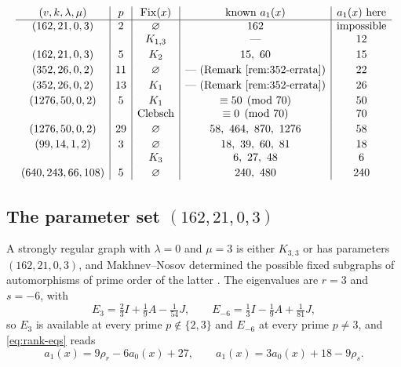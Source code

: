 \documentclass[11pt]{article}
\theoremstyle{plain}
\theoremstyle{remark}
\newcommand{\Fix}{\operatorname{Fix}}
\begin{document}
\begin{table}[t]
\caption{Sharpenings obtained in this section.
Each line gives one branch:
the fixed subgraph, the constraint on $a_1(x)$ that the cited analysis leaves
(``known''; a dash if no valid constraint is available),
and the exact value produced by the rank equations \eqref{eq:rank-eqs} --- or the impossibility of the branch.
``Clebsch'' denotes the unique $\mathrm{srg}(16,5,0,2)$; for the name see Section \ref{subsec:mu2}.
Sources: $(162,21,0,3)$ \cite{MakhnevNosov}; $(352,26,0,2)$ \cite{MakhnevNosov2004};
$(1276,50,0,2)$ \cite{Nosov2016}; $(99,14,1,2)$ \cite{MakhnevMinakova}; $(640,243,66,108)$ \cite{MakhnevNirova}.}\label{tab:sharpening}
\begingroup
\footnotesize
\setlength{\arraycolsep}{2pt}
\[
\begin{array}{c|c|c|c|c}
 (v,k,\lambda,\mu) & p & \Fix(x) & \text{known }a_1(x) & a_1(x)\text{ here}\\
\hline
 (162,21,0,3) & 2 & \varnothing & 162 & \text{impossible}\\
 & & K_{1,3} & \text{---} & 12\\[2pt]
 (162,21,0,3) & 5 & K_2 & 15,\ 60 & 15\\[2pt]
 (352,26,0,2) & 11 & \varnothing & \text{--- (Remark \ref{rem:352-errata})} & 22\\[2pt]
 (352,26,0,2) & 13 & K_1 & \text{--- (Remark \ref{rem:352-errata})} & 26\\[2pt]
 (1276,50,0,2) & 5 & K_1 & \equiv 50 \pmod{70} & 50\\
 & & \text{Clebsch} & \equiv 0 \pmod{70} & 70\\[2pt]
 (1276,50,0,2) & 29 & \varnothing & 58,\ 464,\ 870,\ 1276 & 58\\[2pt]
 (99,14,1,2) & 3 & \varnothing & 18,\ 39,\ 60,\ 81 & 18\\
 & & K_3 & 6,\ 27,\ 48 & 6\\[2pt]
 (640,243,66,108) & 5 & \varnothing & 240,\ 480 & 240
\end{array}
\]
\endgroup
\end{table}

\subsection{\texorpdfstring{The parameter set $(162,21,0,3)$}{The parameter set (162,21,0,3)}}\label{subsec:162}

A strongly regular graph with $\lambda=0$ and $\mu=3$ is either $K_{3,3}$ or has parameters $(162,21,0,3)$,
and Makhnev--Nosov determined the possible fixed subgraphs of automorphisms of prime order of the latter \cite{MakhnevNosov}.
The eigenvalues are $r=3$ and $s=-6$, with
\[
 E_{3}=\tfrac23I+\tfrac19A-\tfrac1{54}J,
 \qquad
 E_{-6}=\tfrac13I-\tfrac19A+\tfrac1{81}J,
\]
so $E_3$ is available at every prime $p\notin\{2,3\}$ and $E_{-6}$ at every prime $p\neq 3$, and \eqref{eq:rank-eqs} reads
\[
 a_1(x)=9\rho_r-6a_0(x)+27,
 \qquad
 a_1(x)=3a_0(x)+18-9\rho_s.
\]
\end{document}
